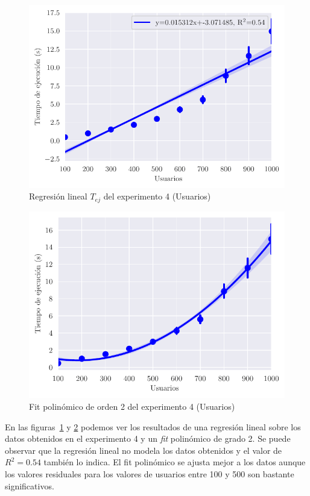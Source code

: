 \begin{figure}[H]
    \centering
    \includegraphics{include/plots/ex4u_time_reg.pdf}
    \caption{Regresión lineal $T_{ej}$ del experimento 4 (Usuarios)}%
    \label{fig:ex4u_reg}
\end{figure}

\begin{figure}[H]
    \centering
    \includegraphics{include/plots/ex4u_time_reg_2.pdf}
    \caption{Fit polinómico de orden 2 del experimento 4 (Usuarios)}%
    \label{fig:ex4u_reg_poly}
\end{figure}

En las figuras~\ref{fig:ex4u_reg} y \ref{fig:ex4u_reg_poly} podemos ver los resultados de una regresión lineal
sobre los datos obtenidos en el experimento 4 y un \emph{fit} polinómico de grado 2. Se puede observar que la
regresión lineal no modela los datos obtenidos y el valor de $R^2=0.54$ también lo indica. El fit polinómico
se ajusta mejor a los datos aunque los valores residuales para los valores de usuarios entre 100 y 500 son
bastante significativos.


